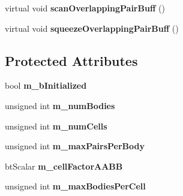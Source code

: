 \begin{DoxyCompactItemize}
\item 
\hypertarget{classbt_gpu3_d_grid_broadphase_a3fd520c5de7034e983fb04b9066139dd}{virtual void {\bfseries scan\+Overlapping\+Pair\+Buff} ()}\label{classbt_gpu3_d_grid_broadphase_a3fd520c5de7034e983fb04b9066139dd}

\item 
\hypertarget{classbt_gpu3_d_grid_broadphase_a93ce349dfc6c9be130f90e49305a9bdd}{virtual void {\bfseries squeeze\+Overlapping\+Pair\+Buff} ()}\label{classbt_gpu3_d_grid_broadphase_a93ce349dfc6c9be130f90e49305a9bdd}

\end{DoxyCompactItemize}
\subsection*{Protected Attributes}
\begin{DoxyCompactItemize}
\item 
\hypertarget{classbt_gpu3_d_grid_broadphase_aeb1271e246db5d20b7db26b4d9eac50a}{bool {\bfseries m\+\_\+b\+Initialized}}\label{classbt_gpu3_d_grid_broadphase_aeb1271e246db5d20b7db26b4d9eac50a}

\item 
\hypertarget{classbt_gpu3_d_grid_broadphase_a5510bbd924eb77bb0c5e2026392e593d}{unsigned int {\bfseries m\+\_\+num\+Bodies}}\label{classbt_gpu3_d_grid_broadphase_a5510bbd924eb77bb0c5e2026392e593d}

\item 
\hypertarget{classbt_gpu3_d_grid_broadphase_aa9624333ee11a51e3ebc2e377476aca4}{unsigned int {\bfseries m\+\_\+num\+Cells}}\label{classbt_gpu3_d_grid_broadphase_aa9624333ee11a51e3ebc2e377476aca4}

\item 
\hypertarget{classbt_gpu3_d_grid_broadphase_aa3295519566a7e5f37996e002dcaf256}{unsigned int {\bfseries m\+\_\+max\+Pairs\+Per\+Body}}\label{classbt_gpu3_d_grid_broadphase_aa3295519566a7e5f37996e002dcaf256}

\item 
\hypertarget{classbt_gpu3_d_grid_broadphase_a8280465b1b126d5a90434d0b4ad85205}{bt\+Scalar {\bfseries m\+\_\+cell\+Factor\+A\+A\+B\+B}}\label{classbt_gpu3_d_grid_broadphase_a8280465b1b126d5a90434d0b4ad85205}

\item 
\hypertarget{classbt_gpu3_d_grid_broadphase_a0bae4c8ca9d656a352f854547ede1d38}{unsigned int {\bfseries m\+\_\+max\+Bodies\+Per\+Cell}}\label{classbt_gpu3_d_grid_broadphase_a0bae4c8ca9d656a352f854547ede1d38}


\end{DoxyCompactItemize}
